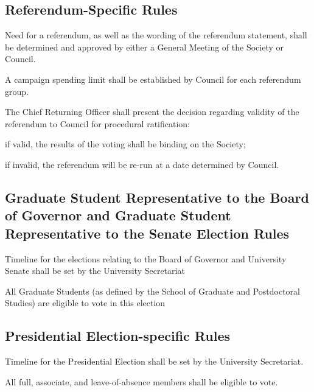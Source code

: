 \subsection{Referendum-Specific Rules}
\begin{longenum}[ label*=\thesubsection.\arabic*., align=left]
	\item Need for a referendum, as well as the wording of the referendum statement, shall be determined and approved by either a General Meeting of the Society or Council. 
    \item A campaign spending limit shall be established by Council for each referendum group.
    \item The Chief Returning Officer shall present the decision regarding validity of the referendum to Council for procedural ratification: 
    \begin{longenum}[ label*=\arabic*., align=left]
		\item if valid, the results of the voting shall be binding on the Society;
        \item if invalid, the referendum will be re-run at a date determined by Council.
	\end{longenum}
    
\end{longenum}

\subsection{Graduate Student Representative to the Board of Governor and Graduate Student Representative to the Senate Election Rules}
\begin{longenum}[ label*=\thesubsection.\arabic*., align=left]
 
\item Timeline for the elections relating to the Board of Governor and University Senate
shall be set by the University Secretariat
\item  All Graduate Students (as defined by the School of Graduate and Postdoctoral Studies) are eligible to vote in this election
\end{longenum}


\subsection{Presidential Election-specific Rules}
\begin{longenum}[ label*=\thesubsection.\arabic*., align=left]
	\item Timeline for the Presidential Election shall be set by the University Secretariat.
    \item All full, associate, and leave-of-absence members shall be eligible to vote. 
\end{longenum}

